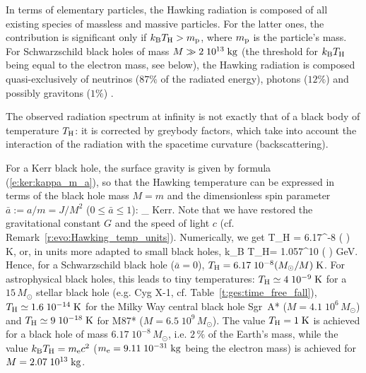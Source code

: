 \begin{remark} \label{r:evo:comp_Hawking_rad}
In terms of elementary particles, the Hawking radiation is composed of
all existing species of massless and massive particles. For the latter ones,
the contribution is significant only if
$k_{\rm B} T_{\rm H} > m_{\rm p}$, where $m_{\rm p}$ is the particle's mass.
For Schwarzschild black holes of mass $M \gg 2\; 10^{13} {\rm\; kg}$ (the threshold
for $k_{\rm B} T_{\rm H}$ being equal to the electron mass, see below), the Hawking radiation
is composed quasi-exclusively of neutrinos ($87\%$ of the radiated energy),
photons ($12\%$) and possibly gravitons ($1\%$) \cite{Page76,ThornZP86}.
\end{remark}

\begin{remark}
The observed radiation spectrum at infinity is not exactly that
of a black body of temperature $T_{\rm H}$: it is corrected
by greybody factors, which take into account the interaction of the radiation
with the spacetime curvature (backscattering).
\end{remark}

For a Kerr black hole, the surface gravity is given by formula (\ref{e:ker:kappa_m_a}),
so that the Hawking temperature can be expressed in terms
of the black hole mass $M=m$ and the dimensionless spin parameter
$\bar{a} := a/m = J/M^2$ ($0\leq \bar{a}\leq 1$):
\be \label{e:evo:T_H_Kerr}
    _{\rm\; Kerr}.
\ee
Note that we have restored the gravitational constant $G$ and the speed of light $c$
(cf. Remark~\ref{r:evo:Hawking_temp_units}). Numerically, we get
\be
    T_{\rm H} = 6.17^{-8} \left(  \right)
     {\rm\; K},
\ee
or, in units more adapted to small black holes,
\be
    k_{\rm B} T_{\rm H}= 1.057^{10} \left(  \right)
     {\rm\; GeV}.
\ee
Hence, for a Schwarzschild black hole ($\bar{a}=0$),
$T_{\rm H} = 6.17\; 10^{-8} ({M_\odot}/{M}) {\rm\; K}$. For astrophysical black holes,
this leads to tiny temperatures: $T_{\rm H} \simeq 4\; 10^{-9} {\rm\; K}$
for a $15 \, M_\odot$ stellar black hole (e.g. Cyg X-1, cf. Table~\ref{t:ges:time_free_fall}),
$T_{\rm H} \simeq 1.6\; 10^{-14} {\rm\; K}$ for the Milky Way central black hole Sgr~A*
($M=4.1\; 10^{6} \, M_\odot$)
and $T_{\rm H} \simeq 9\; 10^{-18} {\rm\; K}$ for M87*
($M=6.5\; 10^{9} \, M_\odot$). The value $T_{\rm H} = 1 {\rm\; K}$ is achieved
for a black hole of mass $6.17\; 10^{-8} \, M_\odot$, i.e. $2\, \%$ of the
Earth's mass, while the value $k_{\rm B} T_{\rm H} = m_{\rm e} c^2$
($m_{\rm e} = 9.11\; 10^{-31}\; {\rm kg}$ being the electron mass) is achieved
for $M = 2.07\; 10^{13}\; {\rm kg}$.

